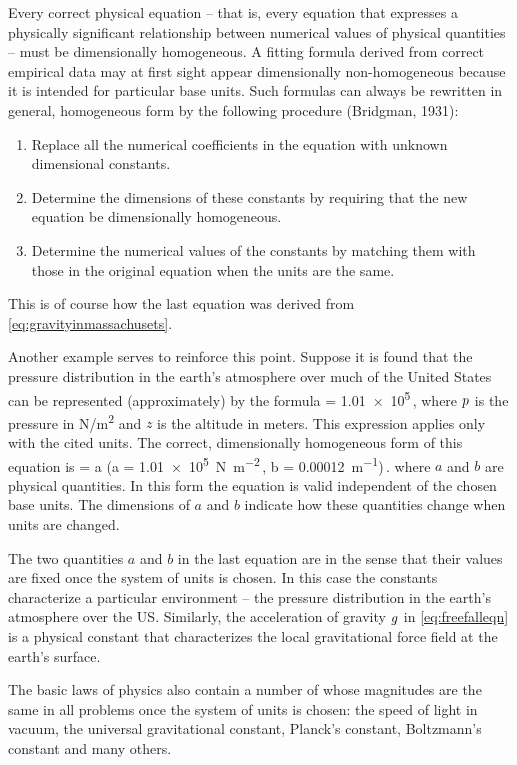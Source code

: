 Every correct physical equation -- that is, every equation that expresses a physically significant relationship between numerical values of physical quantities -- must be dimensionally homogeneous. A fitting formula derived from correct empirical data may at first sight appear dimensionally non-homogeneous because it is intended for particular base units. Such formulas can always be rewritten in general, homogeneous form by the following procedure (Bridgman, 1931):
%
\begin{enumerate}
\item Replace all the numerical coefficients in the equation with unknown dimensional constants.
%
\item Determine the dimensions of these constants by requiring that the new equation be dimensionally homogeneous.
%
\item Determine the numerical values of the constants by matching them with those in the original equation when the units are the same.
\end{enumerate}
%
This is of course how the last equation was derived from \cref{eq:gravityinmassachusets}.

Another example serves to reinforce this point. Suppose it is found that the pressure distribution in the earth's atmosphere over much of the United States can be represented (approximately) by the formula
%
\beq
\press = \num{1.01e5}\exp{}\,,
\eeq
%
where $p$ is the pressure in \si{N/m^2} and $z$ is the altitude in meters. This expression applies only with the cited units. The correct, dimensionally homogeneous form of this equation is
%
\beq
\press = a\exp{}\qquad 
\left(a = \SI{1.01e5}{N.m^{-2}}\,, \quad b = \SI{0.00012}{m^{-1}}\right)\,.
\eeq
%
where $a$ and $b$ are physical quantities. In this form the equation is valid independent of the chosen base units. The dimensions of $a$ and $b$ indicate how these quantities change when units are changed.

The two quantities $a$ and $b$ in the last equation are  in the sense that their values are fixed once the system of units is chosen. In this case the constants characterize a particular environment -- the pressure distribution in the earth's atmosphere over the US. Similarly, the acceleration of gravity $g$ in \cref{eq:freefalleqn} is a physical constant that characterizes the local gravitational force field at the earth's surface.

The basic laws of physics also contain a number of  whose magnitudes are the same in all problems once the system of units is chosen: the speed of light in vacuum, the universal gravitational constant, Planck's constant, Boltzmann's constant and many others.

